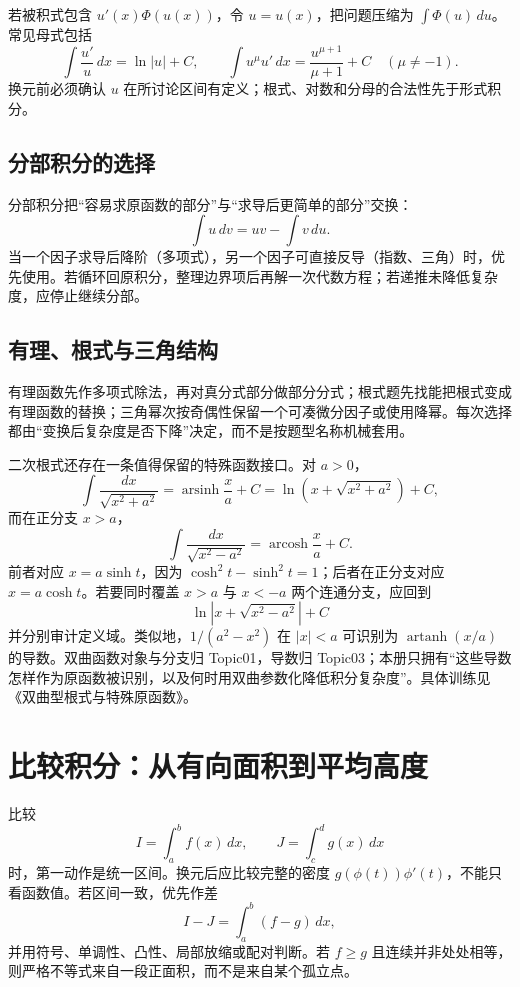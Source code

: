 \documentclass[11pt,a4paper,fontset=fandol]{ctexart}
\begin{document}
若被积式包含 $u'(x)\Phi(u(x))$，令 $u=u(x)$，把问题压缩为 $\int\Phi(u)\,du$。常见母式包括
\[
\int\frac{u'}u\,dx=\ln\lvert u\rvert+C,
\qquad
\int u^\mu u'\,dx=\frac{u^{\mu+1}}{\mu+1}+C\quad(\mu\ne-1).
\]
换元前必须确认 $u$ 在所讨论区间有定义；根式、对数和分母的合法性先于形式积分。

\subsection{分部积分的选择}

分部积分把“容易求原函数的部分”与“求导后更简单的部分”交换：
\[
\int u\,dv=uv-\int v\,du.
\]
当一个因子求导后降阶（多项式），另一个因子可直接反导（指数、三角）时，优先使用。若循环回原积分，整理边界项后再解一次代数方程；若递推未降低复杂度，应停止继续分部。

\subsection{有理、根式与三角结构}

有理函数先作多项式除法，再对真分式部分做部分分式；根式题先找能把根式变成有理函数的替换；三角幂次按奇偶性保留一个可凑微分因子或使用降幂。每次选择都由“变换后复杂度是否下降”决定，而不是按题型名称机械套用。

二次根式还存在一条值得保留的特殊函数接口。对 $a>0$，
\[
\int\frac{dx}{\sqrt{x^2+a^2}}
=\operatorname{arsinh}\frac xa+C
=\ln\left(x+\sqrt{x^2+a^2}\right)+C,
\]
而在正分支 $x>a$，
\[
\int\frac{dx}{\sqrt{x^2-a^2}}
=\operatorname{arcosh}\frac xa+C.
\]
前者对应 $x=a\sinh t$，因为 $\cosh^2t-\sinh^2t=1$；后者在正分支对应 $x=a\cosh t$。若要同时覆盖 $x>a$ 与 $x<-a$ 两个连通分支，应回到
\[
\ln\left\lvert x+\sqrt{x^2-a^2}\right\rvert+C
\]
并分别审计定义域。类似地，$1/(a^2-x^2)$ 在 $\lvert x\rvert<a$ 可识别为 $\operatorname{artanh}(x/a)$ 的导数。双曲函数对象与分支归 Topic01，导数归 Topic03；本册只拥有“这些导数怎样作为原函数被识别，以及何时用双曲参数化降低积分复杂度”。具体训练见《双曲型根式与特殊原函数》。

\section{比较积分：从有向面积到平均高度}

比较
\[
I=\int_a^b{f(x)}\,dx,\qquad J=\int_c^d{g(x)}\,dx
\]
时，第一动作是统一区间。换元后应比较完整的密度 $g(\phi(t))\phi'(t)$，不能只看函数值。若区间一致，优先作差
\[
I-J=\int_a^b(f-g)\,dx,
\]
并用符号、单调性、凸性、局部放缩或配对判断。若 $f\ge g$ 且连续并非处处相等，则严格不等式来自一段正面积，而不是来自某个孤立点。
\end{document}
